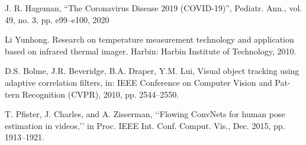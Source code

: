 \documentclass[12pt]{article}
\begin{document}
\noindent J. R. Hageman, “The Coronavirus Disease 2019 (COVID-19)”, Pediatr. Ann., vol. 49, no. 3, pp. e99–e100, 2020

\noindent Li Yunhong. Research on temperature measurement technology and application based on infrared thermal imager. Harbin: Harbin Institute of Technology, 2010.

\noindent D.S. Bolme, J.R. Beveridge, B.A. Draper, Y.M. Lui, Visual object tracking using adaptive correlation filters, in: IEEE Conference on Computer Vision and Pat- tern Recognition (CVPR), 2010, pp. 2544–2550.

\noindent T. Pfister, J. Charles, and A. Zisserman, ‘‘Flowing ConvNets for human pose estimation in videos,’’ in Proc. IEEE Int. Conf. Comput. Vis., Dec. 2015, pp. 1913–1921.
\end{document}
